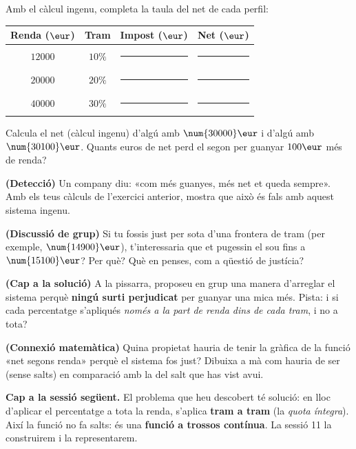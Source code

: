 \begin{exercicis}
\begin{exlist}
  \item Amb el càlcul ingenu, completa la taula del net de cada perfil:
        \begin{center}
        \begin{tabular}{c c c c}
        \toprule
        Renda ($\eur$) & Tram & Impost ($\eur$) & Net ($\eur$) \\
        \midrule
        $\num{12000}$ & $10\%$ & \rule{1.6cm}{0.4pt} & \rule{1.6cm}{0.4pt} \\
        $\num{20000}$ & $20\%$ & \rule{1.6cm}{0.4pt} & \rule{1.6cm}{0.4pt} \\
        $\num{40000}$ & $30\%$ & \rule{1.6cm}{0.4pt} & \rule{1.6cm}{0.4pt} \\
        \bottomrule
        \end{tabular}
        \end{center}
  \item Calcula el net (càlcul ingenu) d'algú amb $\num{30000}\eur$ i d'algú amb
        $\num{30100}\eur$. Quants euros de net perd el segon per guanyar $100\eur$ més
        de renda?
  \item \textbf{(Detecció)} Un company diu: «com més guanyes, més net et queda
        sempre». Amb els teus càlculs de l'exercici anterior, mostra que això és fals
        amb aquest sistema ingenu.
  \item \textbf{(Discussió de grup)} Si tu fossis just per sota d'una frontera de tram
        (per exemple, $\num{14900}\eur$), t'interessaria que et pugessin el sou fins a
        $\num{15100}\eur$? Per què? Què en penses, com a qüestió de justícia?
  \item \textbf{(Cap a la solució)} A la pissarra, proposeu en grup una manera
        d'arreglar el sistema perquè \textbf{ningú surti perjudicat} per guanyar una
        mica més. Pista: i si cada percentatge s'apliqués \emph{només a la part de
        renda dins de cada tram}, i no a tota?
  \item \textbf{(Connexió matemàtica)} Quina propietat hauria de tenir la gràfica de
        la funció «net segons renda» perquè el sistema fos just? Dibuixa a mà com
        hauria de ser (sense salts) en comparació amb la del salt que has vist avui.
\end{exlist}
\end{exercicis}

\begin{idea}
\textbf{Cap a la sessió següent.} El problema que heu descobert té solució: en lloc
d'aplicar el percentatge a tota la renda, s'aplica \textbf{tram a tram} (la
\emph{quota íntegra}). Així la funció no fa salts: és una \textbf{funció a trossos
contínua}. La sessió 11 la construirem i la representarem.
\end{idea}

